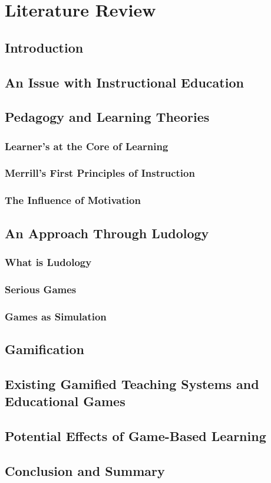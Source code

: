 
\chapter{Literature Review} %

\label{Chapter2} %


\section{Introduction}

\section{An Issue with Instructional Education}

\section{Pedagogy and Learning Theories}
\subsection{Learner's at the Core of Learning}
\subsection{Merrill's First Principles of Instruction}
\subsection{The Influence of Motivation}


\section{An Approach Through Ludology}
\subsection{What is Ludology}
\subsection{Serious Games}
\subsection{Games as Simulation}

\section{Gamification}

\section{Existing Gamified Teaching Systems and Educational Games}

\section{Potential Effects of Game-Based Learning}

\section{Conclusion and Summary}


